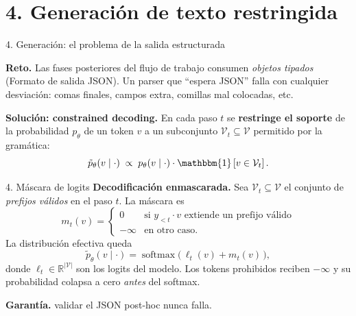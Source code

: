 \documentclass[10pt,aspectratio=169]{beamer}
\newcommand{\vq}{\mathbf{q}}
\newcommand{\R}{\mathbb{R}}
\DeclareMathOperator*{\argmax}{arg\,max}
\DeclareMathOperator{\softmax}{softmax}
\begin{document}

\section*{4. Generación de texto restringida}

\begin{frame}{4. Generación: el problema de la salida estructurada}

	\textbf{Reto.} Las fases posteriores del flujo de trabajo consumen
	\emph{objetos tipados} (Formato de salida JSON). Un parser que
	``espera JSON'' falla con cualquier desviación: comas finales,
	campos extra, comillas mal colocadas, etc.

	\medskip
	\textbf{Solución: constrained decoding.} En cada paso $t$ se
	\textbf{restringe el soporte} de la probabilidad $p_\theta$ de un token $v$ a un subconjunto
	$\mathcal{V}_t \subseteq \mathcal{V}$ permitido por la gramática:
	\[
		\tilde p_\theta(v\mid \cdot) \;\propto\;
		p_\theta(v\mid \cdot)\cdot \mathbbm{1}\left[v \in \mathcal{V}_t\right].
	\]
\end{frame}

\begin{frame}{4. Máscara de logits}
	\textbf{Decodificación enmascarada.} Sea $\mathcal{V}_t \subseteq \mathcal{V}$ el
	conjunto de \emph{prefijos válidos} en el paso $t$. La máscara es
	\[
		m_t(v) =
		\begin{cases}
			0       & \text{si } y_{<t}\!\cdot\!v \text{ extiende un prefijo válido} \\
			-\infty & \text{en otro caso.}
		\end{cases}
	\]
	La distribución efectiva queda
	\[
		\tilde p_\theta(v \mid \cdot) =
		\softmax\bigl(\,\ell_t(v) + m_t(v)\,\bigr),
	\]
	donde $\ell_t \in \R^{|\mathcal{V}|}$ son los logits del modelo.
	Los tokens prohibidos reciben $-\infty$ y su probabilidad colapsa
	a cero \emph{antes} del softmax.

	\textbf{Garantía.} validar el JSON post-hoc nunca falla.
\end{frame}
\end{document}
